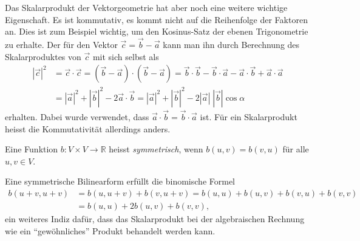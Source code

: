 Das Skalarprodukt der Vektorgeometrie hat aber noch eine weitere
wichtige Eigenschaft.
Es ist kommutativ, es kommt nicht auf die Reihenfolge der Faktoren an.
Dies ist zum Beispiel wichtig, um den Kosinus-Satz der ebenen Trigonometrie
zu erhalte.
Der für den Vektor
%
%
$\vec{c} = \vec{b}-\vec{a}$ 
kann man ihn durch Berechnung des Skalarproduktes von $\vec{c}$ mit
sich selbst als
\begin{align*}
|\vec{c}|^2
&=
\vec{c}\cdot\vec{c}
=
(\vec{b}-\vec{a})\cdot(\vec{b}-\vec{a})
=
\vec{b}\cdot\vec{b}
-
\vec{b}\cdot\vec{a}
-
\vec{a}\cdot\vec{b}
+
\vec{a}\cdot\vec{a}
\\
&=
|\vec{a}|^2 + |\vec{b}|^2 - 2 \vec{a}\cdot\vec{b}
=
|\vec{a}|^2 + |\vec{b}|^2 - 2 |\vec{a}|\;|\vec{b}|\cos\alpha
\end{align*}
erhalten.
Dabei wurde verwendet, dass $\vec{a}\cdot\vec{b}=\vec{b}\cdot\vec{a}$ ist.
Für ein Skalarprodukt heisst die Kommutativität allerdings anders.

\begin{definition}
Eine Funktion $b\colon V\times V \to\mathbb{R}$ heisst {\em symmetrisch},
wenn $b(u,v)=b(v,u)$ für alle $u,v\in V$.
%
\end{definition}

Eine symmetrische Bilinearform erfüllt die binomische Formel
\begin{align*}
b(u+v,u+v)
&=
b(u,u+v) + b(v,u+v)
=
b(u,u)+b(u,v)+b(v,u)+b(v,v)
\\
&=
b(u,u) + 2b(u,v) + b(v,v),
\end{align*}
ein weiteres Indiz dafür, dass das Skalarprodukt bei der algebraischen
Rechnung wie ein ``gewöhnliches'' Produkt behandelt werden kann.

